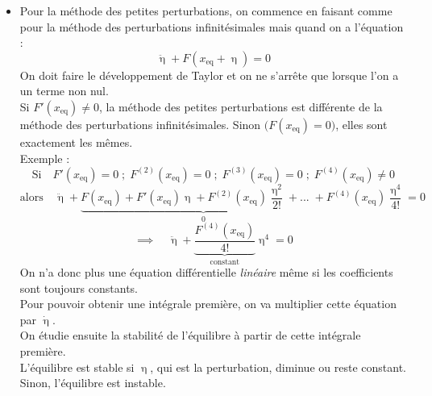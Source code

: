 \documentclass[a4paper]{article}
\begin{document}
\begin{itemize}
\item Pour la méthode des petites perturbations, on commence en faisant comme pour la méthode des perturbations infinitésimales mais quand on a l'équation : 
\[ \ddot{\upeta} + F(x_{\text{eq}} + \upeta) = 0 \]
On doit faire le développement de Taylor et on ne s'arrête que lorsque l'on a un terme non nul. \\
Si $ F'(x_{\text{eq}}) \neq 0 $, la méthode des petites perturbations est différente de la méthode des perturbations infinitésimales. Sinon $ \big( F(x_{\text{eq}}) = 0 \big) $, elles sont exactement les mêmes. \\
Exemple : 
\[ \text{Si} \quad F'(x_{\text{eq}}) = 0 \; ; \; F^{(2)}(x_{\text{eq}}) = 0 \; ; \; F^{(3)}(x_{\text{eq}}) = 0 \; ; \; F^{(4)}(x_{\text{eq}}) \neq 0 \]
\[ \text{alors} \quad \ddot{\upeta} + \underbrace{ F(x_{\text{eq}}) + F'(x_{\text{eq}}) \upeta + F^{(2)}(x_{\text{eq}}) \frac{\upeta^2}{2 !} + ... \; + }_{0} F^{(4)}(x_{\text{eq}}) \frac{\upeta^4}{4 !} = 0 \]
\[ \implies \quad \ddot{\upeta} + \underbrace{\frac{F^{(4)}(x_{\text{eq}})}{4 !}}_{\text{constant}} \upeta^4 = 0 \]
On n'a donc plus une équation différentielle \emph{linéaire} même si les coefficients sont toujours constants. \\
Pour pouvoir obtenir une intégrale première, on va multiplier cette équation par $ \dot{\upeta} $. \\
On étudie ensuite la stabilité de l'équilibre à partir de cette intégrale première. \\
L'équilibre est stable si $ \upeta $, qui est la perturbation, diminue ou reste constant. Sinon, l'équilibre est instable.






\end{itemize}
\end{document}
